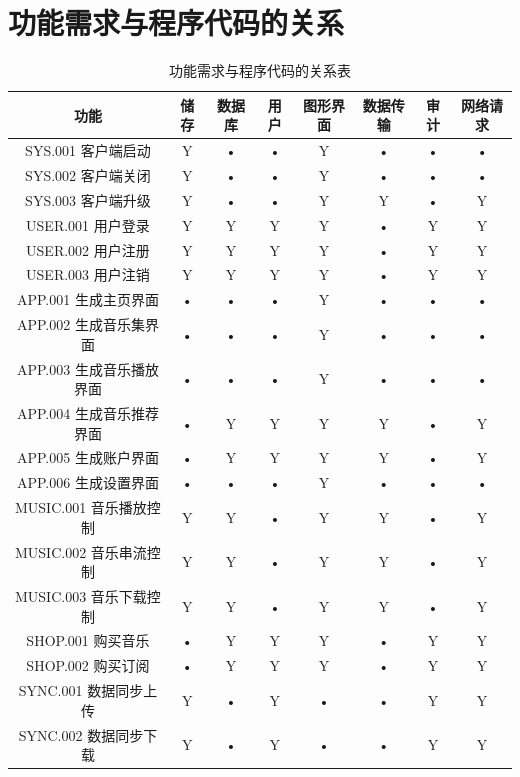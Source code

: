\section{功能需求与程序代码的关系}
\begin{table}[htbp]
\centering
\caption{功能需求与程序代码的关系表} \label{tab:requirement-module}
\small

\begin{tabular}{|c|c|c|c|c|c|c|c|}

    \hline
    功能 &              储存 & 数据库 & 用户 & 图形界面 & 数据传输 & 审计 & 网络请求 \\
    \hline
    SYS.001 客户端启动 &   Y &    •   & •    &     Y    &    •     &  •   &   •      \\
    \hline
    SYS.002 客户端关闭 &   Y &    •   & •    &     Y    &    •     &  •   &   •      \\
    \hline
    SYS.003 客户端升级 &   Y &    •   & •    &     Y    &    Y     &  •   &   Y      \\
    \hline
    USER.001 用户登录  &   Y &    Y   & Y    &     Y    &    •     &  Y   &   Y      \\
    \hline
    USER.002 用户注册  &   Y &    Y   & Y    &     Y    &    •     &  Y   &   Y      \\
    \hline
    USER.003 用户注销  &   Y &    Y   & Y    &     Y    &    •     &  Y   &   Y      \\
    \hline
APP.001 生成主页界面   &   • &    •   & •    &     Y    &    •     &  •   &   •      \\
    \hline
APP.002 生成音乐集界面 &   • &    •   & •    &     Y    &    •     &  •   &   •      \\
    \hline
APP.003 生成音乐播放界面 & • &    •   & •    &     Y    &    •     &  •   &   •      \\
    \hline
APP.004 生成音乐推荐界面 & • &    Y   & Y    &     Y    &    Y     &  •   &   Y      \\
    \hline
APP.005 生成账户界面   &   • &    Y   & Y    &     Y    &    Y     &  •   &   Y      \\
    \hline
APP.006 生成设置界面   &   • &    •   & •    &     Y    &    •     &  •   &   •      \\
    \hline
MUSIC.001 音乐播放控制 &   Y &    Y   & •    &     Y    &    Y     &  •   &   Y      \\
    \hline
MUSIC.002 音乐串流控制 &   Y &    Y   & •    &     Y    &    Y     &  •   &   Y      \\
    \hline
MUSIC.003 音乐下载控制 &   Y &    Y   & •    &     Y    &    Y     &  •   &   Y      \\
    \hline
    SHOP.001 购买音乐  &   • &    Y   & Y    &     Y    &    •     &  Y   &   Y      \\
    \hline
    SHOP.002 购买订阅  &   • &    Y   & Y    &     Y    &    •     &  Y   &   Y      \\
    \hline
SYNC.001 数据同步上传  &   Y &    •   & Y    &     •    &    •     &  Y   &   Y      \\
    \hline
SYNC.002 数据同步下载  &   Y &    •   & Y    &     •    &    •     &  Y   &   Y      \\
    \hline


\end{tabular}
\end{table}
